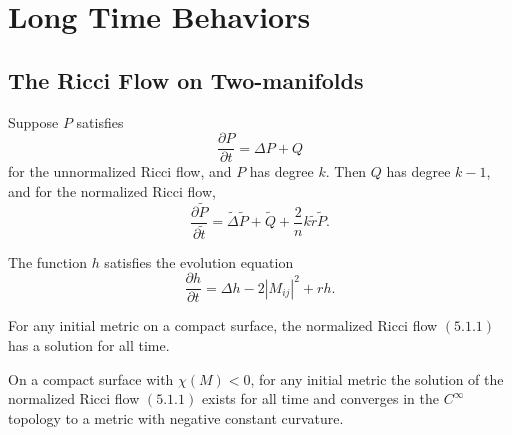 \chapter{Long Time Behaviors}
\label{chap:cz-long-time-behavior}
\section{The Ricci Flow on Two-manifolds}
\begin{lemma} 
  \label{lem:cz-normalized-evolution-homogeneous-quantities}

Suppose $P$ satisfies
$$
\frac{\partial P}{\partial t}=\Delta P+Q
$$
for the unnormalized Ricci flow, and $P$ has degree $k$. Then $Q$
has degree $k-1$, and for the normalized Ricci flow,
$$
\frac{\partial \tilde{P}}{\partial \tilde{t}}=\tilde{\Delta}
\tilde{P}+\tilde{Q}+\frac{2}{n}k\tilde{r}\tilde{P}.
$$
\end{lemma}
\begin{lemma} 
  \label{lem:cz-curvature-potential-density-evolution}

The function $h$ satisfies the evolution equation \begin{equation}
\frac{\partial h}{\partial t}=\Delta h-2|M_{ij}|^2+rh.
\end{equation}
\end{lemma}
\begin{proposition} 
  \label{prop:cz-normalized-surface-flow-immortal}

For any initial metric on a compact surface, the normalized Ricci
flow $(5.1.1)$ has a solution for all time.
\end{proposition}
\begin{theorem}
  \label{thm:cz-negative-euler-surface-convergence}

On a compact surface with $\chi(M)<0$, for any initial metric the
solution of the normalized Ricci flow $(5.1.1)$ exists for all
time and converges in the $C^{\infty}$ topology to a metric with
negative constant curvature.
\end{theorem}
